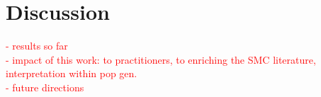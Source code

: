 \documentclass[fleqn]{article}
\begin{document}
\section{Discussion}
\textcolor{red}{
- results so far\\
- impact of this work: to practitioners, to enriching the SMC literature, interpretation within pop gen.\\
- future directions
}



\end{document}
